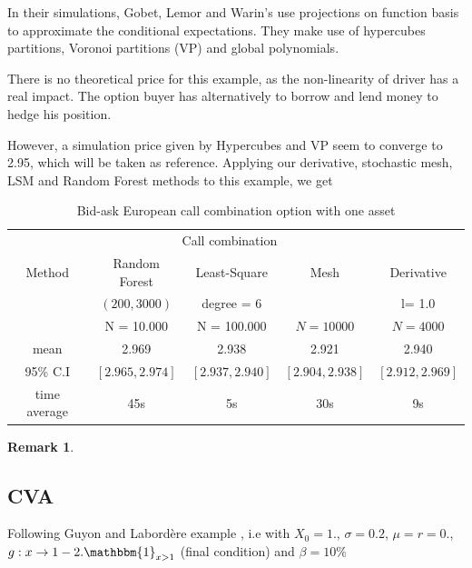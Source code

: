 \documentclass[english,11pt,openany]{report}
\theoremstyle{definition}
\theoremstyle{plain}
\theoremstyle{definition}
\newtheorem{Rem}[Th]{Remark}
\begin{document}
In their simulations, Gobet, Lemor and Warin's use projections on function basis to approximate the conditional expectations. They make use of hypercubes partitions, Voronoi partitions (VP) and global polynomials.

There is no theoretical price for this example, as the non-linearity of driver has a real impact. The option buyer has alternatively to borrow and lend money to hedge his position.

However, a simulation price given by Hypercubes and VP seem to converge to 2.95, which will be taken as reference. 
Applying our derivative, stochastic mesh, LSM and Random Forest methods to this example, we get

\begin{table}[H]
	\centering
	\caption{Bid-ask European call combination option with one asset}\label{table:bid_ask_call_combi_1D}
	\begin{tabular}{*5c}
		\toprule
		& \multicolumn{3}{c}{Call combination } \\
		\cmidrule(lr){2-5}
		Method & Random Forest  & Least-Square & Mesh & Derivative \\    
		& $(200, 3000)$ & degree = $6$     &  & l= 1.0\\
		& N = 10.000 & N = 100.000     & $N = 10 000$ &  $N = 4 000$   \\
		\midrule
		mean &     2.969   & 2.938  &  2.921  &  2.940 \\ 
		95\% C.I &   $[2.965, 2.974]$     &    $[2.937, 2.940]$     & $[2.904, 2.938]$ & $[2.912, 2.969]$  \\
		time average &  45s      & 5s  & 30s & 9s \\
		\bottomrule
	\end{tabular}
\end{table}

\begin{Rem}
	
\end{Rem}

\subsection{CVA}

Following Guyon and Labordère example \cite{GuyonLabordere:cva}, i.e with $X_0 = 1.$, $\sigma = 0.2$, $\mu=r=0.$, $g:x \rightarrow 1 - 2.\mathbbm{1}_{x>1}$ (final condition) and $\beta = 10\%$
\end{document}
